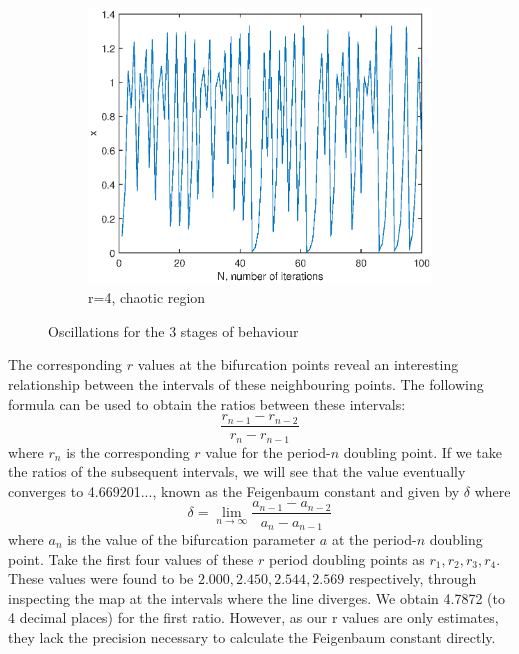 \documentclass[a4paper]{article}
\begin{document}
\begin{figure}
\begin{subfigure}[b]{0.3\textwidth}
    \end{subfigure}
    ~ %
    \begin{subfigure}[b]{0.3\textwidth}
        \includegraphics[width=\textwidth]{verhulstChaos}
        \caption{r=4, chaotic region}
    \end{subfigure}
    \caption{Oscillations for the 3 stages of behaviour}\label{fig:animals}
\end{figure} 

The corresponding $ r $ values at the bifurcation points reveal an interesting relationship between the intervals of these neighbouring points. The following formula can be used to obtain the ratios between these intervals:
{\[\frac{r_{n-1} - r_{n-2}}{r_n - r_{n-1}}\] }
where $r_n$ is the corresponding $r$ value for the period-$n$ doubling point. If we take the ratios of the subsequent intervals, we will see that the value eventually converges to 4.669201..., known as the Feigenbaum constant and given by $\delta$ where {\[\delta = \lim_{n \rightarrow \infty} \frac{a_{n-1} - a_{n-2}}{a_n - a_{n-1}}\] } 
where $a_n$ is the value of the bifurcation parameter $a$ at the period-$n$ doubling point. 
Take the first four values of these $ r $ period doubling points as $r_1, r_2, r_3, r_4$. These values were found to be $2.000, 2.450, 2.544, 2.569$ respectively, through inspecting the map at the intervals where the line diverges. We obtain 4.7872 (to 4 decimal places) for the first ratio. However, as our r values are only estimates, they lack the precision necessary to calculate the Feigenbaum constant directly.
\end{document}
